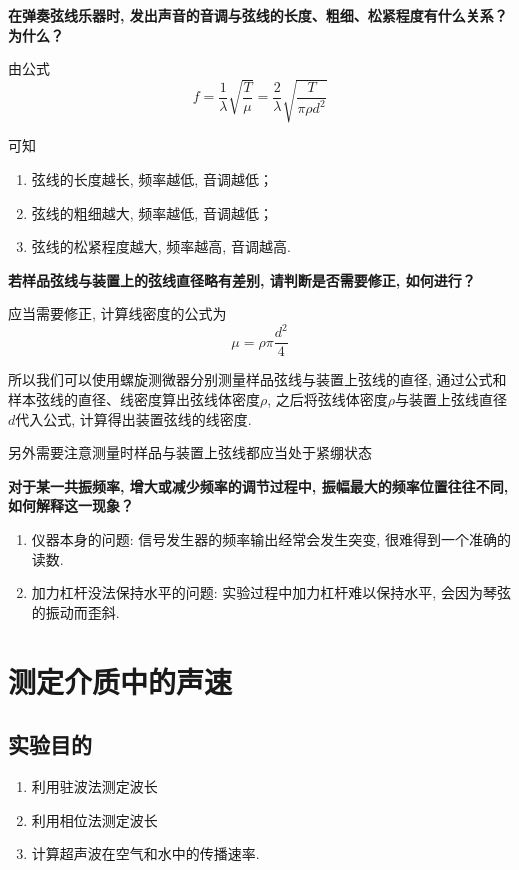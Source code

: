 \documentclass[zihao=5, UTF8]{article}
\theoremstyle{MyLineTheoremStyle} %
\theoremstyle{MyBlockTheoremStyle} %
\theoremstyle{MySubsubsectionStyle} %
\begin{document}
\textbf{在弹奏弦线乐器时, 发出声音的音调与弦线的长度、粗细、松紧程度有什么关系？为什么？}

由公式
\begin{equation}
    f = \frac{1}{\lambda}\sqrt{\frac{T}{\mu}} = \frac{2}{\lambda}\sqrt{\frac{T}{\pi\rho d^{2}}}
\end{equation}

可知
\begin{enumerate}
    \item 弦线的长度越长, 频率越低, 音调越低；
    \item 弦线的粗细越大, 频率越低, 音调越低；
    \item 弦线的松紧程度越大, 频率越高, 音调越高. 
\end{enumerate}

\textbf{若样品弦线与装置上的弦线直径略有差别, 请判断是否需要修正, 如何进行？}

应当需要修正, 计算线密度的公式为
\begin{equation}
    \mu = \rho\pi\frac{d^{2}}{4}
\end{equation}

所以我们可以使用螺旋测微器分别测量样品弦线与装置上弦线的直径, 通过公式和样本弦线的直径、线密度算出弦线体密度$\rho$, 之后将弦线体密度$\rho$与装置上弦线直径$d$代入公式, 计算得出装置弦线的线密度. 

另外需要注意测量时样品与装置上弦线都应当处于紧绷状态

\textbf{对于某一共振频率, 增大或减少频率的调节过程中, 振幅最大的频率位置往往不同, 如何解释这一现象？}
\begin{enumerate}
    \item 仪器本身的问题: 信号发生器的频率输出经常会发生突变, 很难得到一个准确的读数. 
    \item 加力杠杆没法保持水平的问题: 实验过程中加力杠杆难以保持水平, 会因为琴弦的振动而歪斜.
\end{enumerate}
\section{测定介质中的声速}
\subsection{实验目的}
\begin{enumerate}
    \item 利用驻波法测定波长
    \item 利用相位法测定波长
    \item 计算超声波在空气和水中的传播速率. 
\end{enumerate}
\end{document}
